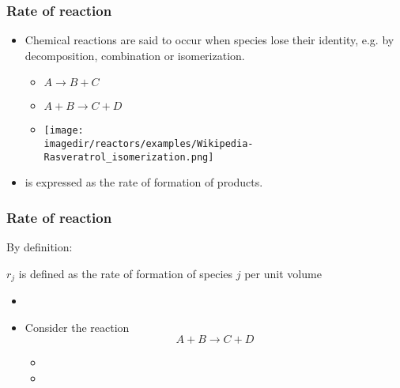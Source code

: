 \begin{frame}\frametitle{Rate of reaction}
	\begin{itemize}
		\item	 Chemical reactions are said to occur when species lose their identity, e.g. by decomposition, combination or isomerization.
		\begin{itemize}
			\item	$ A  \longrightarrow B + C $
			\item	$ A + B \longrightarrow C + D $
			\item	\texttt{[image: \\imagedir/reactors/examples/Wikipedia-Rasveratrol\_isomerization.png]}\qquad{}
		\end{itemize}
		\item	 {\color{purple}{Rate of reaction}} is expressed as the rate of formation of products.
	\end{itemize}
\end{frame}

\begin{frame}\frametitle{Rate of reaction}
	By definition:
	\begin{exampleblock}{}
		\begin{center}
			{\Large $r_j$ is defined as the rate of formation of species $j$ per unit volume}
		\end{center}
	\end{exampleblock}
	\begin{itemize}
		\item	{}
		\item	 Consider the reaction $$ A + B \longrightarrow C + D $$
		\begin{itemize}
			\item	{}
			\item	{}
		\end{itemize}
	\end{itemize}
\end{frame}

